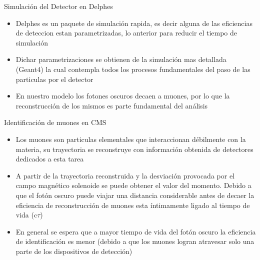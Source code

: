 \begin{frame}{Simulaci\'on del Detector en Delphes}

\begin{itemize}
    \item Delphes es un paquete de simulaci\'on rapida, es decir alguna de las eficiencias de deteccion estan parametrizadas, lo anterior para reducir el tiempo de simulaci\'on 
    \item Dichar parametrizaciones se obtienen de la simulaci\'on mas detallada (Geant4) la cual contempla todos los procesos fundamentales del paso de las particulas por el detector
    \item En nuestro modelo los fotones oscuros decaen a muones, por lo que la reconstrucci\'on de los mismos es parte fundamental del an\'alisis
\end{itemize}
\end{frame}

\begin{frame}{Identificación de muones en CMS}
    
\begin{itemize}
  
    \item Los muones son particulas elementales que interaccionan débilmente con la materia, su trayectoria se reconstruye con informaci\'on obtenida de detectores dedicados a esta tarea
    \item A partir de la trayectoria reconstruida y la desviaci\'on provocada por el campo magn\'etico solenoide se puede obtener el valor del momento.
    \tiem Debido a que el fotón oscuro puede viajar una distancia considerable antes de decaer la eficiencia de reconstrucción de muones esta íntimamente ligado al tiempo de vida (c$\tau$) 
    \item En general se espera que a mayor tiempo de vida del fotón oscuro la eficiencia de identificación es menor (debido a que los muones logran atravesar solo una parte de los dispositivos de detección)
\end{itemize}
\end{frame}

